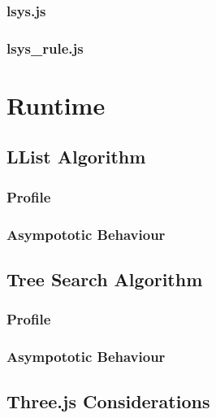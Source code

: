 \documentclass{article}
\begin{document}
            \subsubsection{lsys.js}
            \subsubsection{lsys\_rule.js}

    \section{Runtime}
        \subsection{LList Algorithm}
            \subsubsection{Profile}
            \subsubsection{Asympototic Behaviour}
        \subsection{Tree Search Algorithm}
            \subsubsection{Profile}
            \subsubsection{Asympototic Behaviour}
        \subsection{Three.js Considerations}
\end{document}
